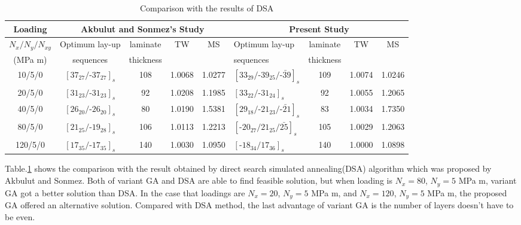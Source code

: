 \begin{table}
	\normalsize
\caption{Comparison with the results of DSA}
\label{tab:comparision}
\centering
\begin{tabular}{c|cccc|lccc}
	\toprule
	\textbf{Loading}	    & \multicolumn {4}{c}{\textbf{Akbulut and Sonmez's\cite{akbulut2008optimum} Study}}   & \multicolumn {4}{c}{\textbf{Present Study}}\\
	\midrule
	 $N_{x}/N_{y}/N_{xy}$   & Optimum lay-up			        & laminate  & TW & MS   & Optimum lay-up & laminate  & TW & MS \\
	  (MPa m)	            & sequences					        & thickness &    &      & sequences	     & thickness &    &    \\
	\midrule
	  10/5/0                 &  $[37_{27}/\text{-}37_{27}]_s$     &  108      &  1.0068  &  1.0277 & $[33_{29}/\text{-}39_{25}/\bar{\text{-}39}]_s$     &     109      &  1.0074      &  1.0246  \\
	  20/5/0                 &  $[31_{23}/\text{-}31_{23}]_s$     &  92       &  1.0208  &  1.1985 & $[33_{22}/\text{-}31_{24}]_s$                      &     92      &  1.0055       &  1.2065    \\
	  40/5/0                 &  $[26_{20}/\text{-}26_{20}]_s$     &  80       &  1.0190  &  1.5381 & $[29_{18}/\text{-}21_{23}/\bar{\text{-}21}]_s$     &     83      &  1.0034       &  1.7350   \\
	  80/5/0                 &  $[21_{25}/\text{-}19_{28}]_s$     &  106      &  1.0113  &  1.2213 & $[\text{-}20_{27}/21_{25}/\bar{25}]_s$             &     105      &  1.0029      &  1.2063    \\
	  120/5/0                &  $[17_{35}/\text{-}17_{35}]_s$     &  140      &  1.0030  &  1.0950 & $[\text{-}18_{34}/17_{36}]_s$                     &     140      &  1.0000      &  1.0898     \\
	\bottomrule
\end{tabular}
\end{table}

Table.\ref{tab:comparision} shows the comparison with the result obtained by
direct search simulated annealing(DSA) algorithm which was proposed by Akbulut
and Sonmez\cite{akbulut2008optimum}.  Both of variant GA and DSA are able to
find feasible solution, but when loading is $N_x=80$, $N_y=5$ MPa m, variant GA
got a better solution than DSA. In the case that loadings are $N_x=20$, $N_y=5$ MPa m,
and $N_x=120$, $N_y=5$ MPa m,  the proposed GA offered an alternative solution. Compared
with DSA method, the last advantage of variant GA is the number of layers
doesn't have to be even.

